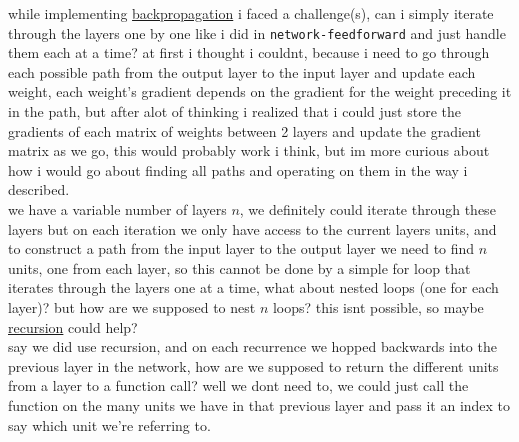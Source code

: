 \documentclass[a4paper,12pt]{article}
\begin{document}
while implementing \href{20230503165849-backpropagation.org}{backpropagation} i faced a challenge(s), can i simply iterate through the layers one by one like i did in \texttt{network-feedforward} and just handle them each at a time? at first i thought i couldnt, because i need to go through each possible path from the output layer to the input layer and update each weight, each weight's gradient depends on the gradient for the weight preceding it in the path, but after alot of thinking i realized that i could just store the gradients of each matrix of weights between 2 layers and update the gradient matrix as we go, this would probably work i think, but im more curious about how i would go about finding all paths and operating on them in the way i described.\\
we have a variable number of layers \(n\), we definitely could iterate through these layers but on each iteration we only have access to the current layers units, and to construct a path from the input layer to the output layer we need to find \(n\) units, one from each layer, so this cannot be done by a simple for loop that iterates through the layers one at a time, what about nested loops (one for each layer)? but how are we supposed to nest \(n\) loops? this isnt possible, so maybe \href{20221105001640-recursive_function.org}{recursion} could help?\\
say we did use recursion, and on each recurrence we hopped backwards into the previous layer in the network, how are we supposed to return the different units from a layer to a function call? well we dont need to, we could just call the function on the many units we have in that previous layer and pass it an index to say which unit we're referring to.\\
\lstset{language=Lisp,label= ,caption= ,captionpos=b,numbers=none}
\end{document}
